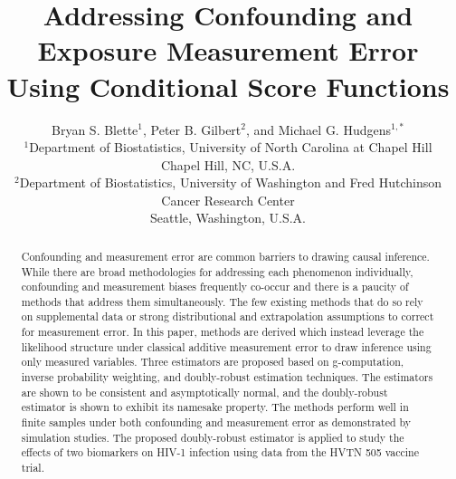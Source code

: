 \documentclass[useAMS,usenatbib,referee]{biom}
\title[Addressing Confounding and Measurement Error]{Addressing Confounding and Exposure Measurement Error Using Conditional Score Functions}
\author{Bryan S. Blette$^{1}$, Peter B. Gilbert$^{2}$, and Michael G. Hudgens$^{1,*}$\email{mhudgens@email.unc.edu} \\ $^{1}$Department of Biostatistics, University of North Carolina at Chapel Hill
\\ Chapel Hill, NC, U.S.A. \\
$^{2}$Department of Biostatistics, University of Washington and Fred Hutchinson Cancer Research Center
\\ Seattle, Washington, U.S.A.}
\begin{document}










\label{firstpage}


\begin{abstract}
Confounding and measurement error are common barriers to drawing causal inference. While there are broad methodologies for addressing each phenomenon individually, confounding and measurement biases frequently co-occur and there is a paucity of methods that address them simultaneously. The few existing methods that do so rely on supplemental data or strong distributional and extrapolation assumptions to correct for measurement error. In this paper, methods are derived which instead leverage the likelihood structure under classical additive measurement error to draw inference using only measured variables. Three estimators are proposed based on g-computation, inverse probability weighting, and doubly-robust estimation techniques. The estimators are shown to be consistent and asymptotically normal, and the doubly-robust estimator is shown to exhibit its namesake property. The methods perform well in finite samples under both confounding and measurement error as demonstrated by simulation studies. The proposed doubly-robust estimator is applied to study the effects of two biomarkers on HIV-1 infection using data from the HVTN 505 vaccine trial.
\end{abstract}
\end{document}
